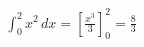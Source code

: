 \documentclass[preview]{standalone}
\begin{document}
\begin{align*}
\int_0^2 x^2 \, dx = \left[ \frac{x^3}{3} \right]_0^2 = \frac{8}{3}
\end{align*}
\end{document}

